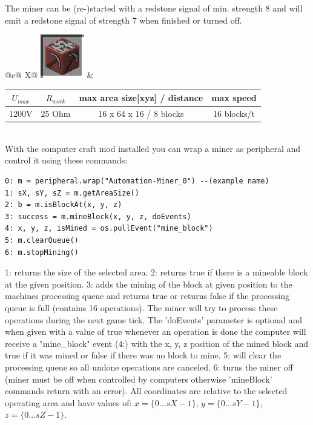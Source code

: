 \documentclass[11pt]{article} %
\makeatletter
\newcommand{\imgtex}{\begin{tabularx}{\textwidth}{@{}c@{ }X@{}}}
\makeatother
\begin{document}
The miner can be (re-)started with a redstone signal of min. strength 8 and will emit a redstone signal of strength 7 when finished or turned off.\\
\imgtex
\includegraphics[align = m]{blockMiner} &
\begin{tabular}{| c | c | c | c |} \hline
\bf $U_{max}$ & \bf $R_{work}$ & \bf max area size[xyz] / distance & \bf max speed \\ \hline
1200V & 25 Ohm & 16 x 64 x 16 / 8 blocks & 16 blocks/t \\ \hline
\end{tabular}
\end{tabularx} \\
With the computer craft mod installed you can wrap a miner as peripheral and control it using these commands:
\begin{lstlisting}
0: m = peripheral.wrap("Automation-Miner_0") --(example name)
1: sX, sY, sZ = m.getAreaSize() 
2: b = m.isBlockAt(x, y, z) 
3: success = m.mineBlock(x, y, z, doEvents)
4: x, y, z, isMined = os.pullEvent("mine_block")
5: m.clearQueue()
6: m.stopMining()
\end{lstlisting}
1: returns the size of the selected area. 2: returns true if there is a mineable block at the given position. 3: adds the mining of the block at given position to the machines processing queue and returns true or returns false if the processing queue is full (contains 16 operations). The miner will try to process these operations during the next game tick. The 'doEvents' parameter is optional and when given with a value of true whenever an operation is done the computer will receive a "mine\_block" event (4:) with the x, y, z position of the mined block and true if it was mined or false if there was no block to mine. 5: will clear the processing queue so all undone operations are canceled. 6: turns the miner off (miner must be off when controlled by computers otherwise 'mineBlock' commands return with an error). All coordinates are relative to the selected operating area and have values of: $x=\{0 \dots sX-1\}$, $y=\{0 \dots sY - 1\}$, $z=\{0 \dots sZ - 1\}$.
\end{document}
